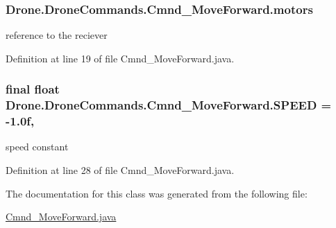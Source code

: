 \subsubsection[{motors}]{ Drone.\+Drone\+Commands.\+Cmnd\+\_\+\+Move\+Forward.\+motors\hspace{0.3cm}{\ttfamily [private]}}\label{class_drone_1_1_drone_commands_1_1_cmnd___move_forward_aec6387076f3e78a7295606c2473da639}
reference to the reciever 

Definition at line 19 of file Cmnd\+\_\+\+Move\+Forward.\+java.

\hypertarget{class_drone_1_1_drone_commands_1_1_cmnd___move_forward_a7d52a7ebe976f4f06332f4c98469f6e0}{}
\subsubsection[{S\+P\+E\+E\+D}]{\setlength{\rightskip}{0pt plus 5cm}final float Drone.\+Drone\+Commands.\+Cmnd\+\_\+\+Move\+Forward.\+S\+P\+E\+E\+D = -\/1.\+0f\hspace{0.3cm}{\ttfamily [static]}, {\ttfamily [private]}}\label{class_drone_1_1_drone_commands_1_1_cmnd___move_forward_a7d52a7ebe976f4f06332f4c98469f6e0}
speed constant 

Definition at line 28 of file Cmnd\+\_\+\+Move\+Forward.\+java.



The documentation for this class was generated from the following file\+:\begin{DoxyCompactItemize}
\item 
\hyperlink{_cmnd___move_forward_8java}{Cmnd\+\_\+\+Move\+Forward.\+java}\end{DoxyCompactItemize}
